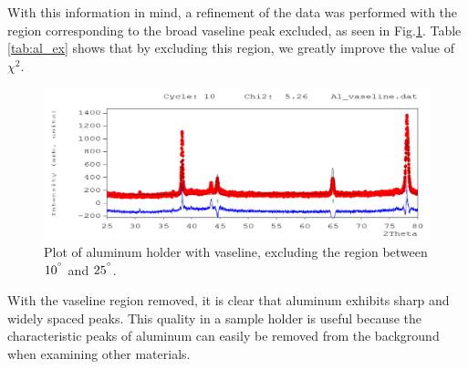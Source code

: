 \documentclass[12pt]{article}
\begin{document}
\noindent
With this information in mind, a refinement of the data was performed with the region corresponding to the broad vaseline peak excluded, as seen in Fig.\ref{fig: Al_vas_ex}. Table \ref{tab:al_ex} shows that by excluding this region, we greatly improve the value of $\chi^2$. 
\newpage
\begin{figure}[t]
 \quad \includegraphics[width=1\textwidth]{al_samp_exclud}
\caption{Plot of aluminum holder with vaseline, excluding the region between $10^{\degree}$ and $25^{\degree}$.}
\label{fig: Al_vas_ex}
\end{figure}

\noindent
With the vaseline region removed, it is clear that aluminum exhibits sharp and widely spaced peaks. This quality in a sample holder is useful because the characteristic peaks of aluminum can easily be removed from the background when examining other materials.\\
\end{document}
